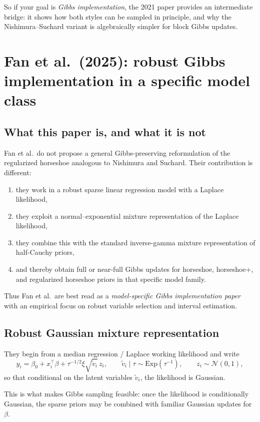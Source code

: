 \documentclass[11pt]{article}
\newcommand{\Normal}{\mathcal{N}}
\begin{document}
So if your goal is \emph{Gibbs implementation}, the 2021 paper provides an intermediate bridge: it shows how both styles can be sampled in principle, and why the Nishimura--Suchard variant is algebraically simpler for block Gibbs updates.

\section{Fan et al.\ (2025): robust Gibbs implementation in a specific model class}

\subsection{What this paper is, and what it is not}

Fan et al.\ do not propose a general Gibbs-preserving reformulation of the regularized horseshoe analogous to Nishimura and Suchard. Their contribution is different:
\begin{enumerate}
\item they work in a robust sparse linear regression model with a Laplace likelihood,
\item they exploit a normal--exponential mixture representation of the Laplace likelihood,
\item they combine this with the standard inverse-gamma mixture representation of half-Cauchy priors,
\item and thereby obtain full or near-full Gibbs updates for horseshoe, horseshoe+, and regularized horseshoe priors in that specific model family.
\end{enumerate}

Thus Fan et al.\ are best read as a \emph{model-specific Gibbs implementation paper} with an empirical focus on robust variable selection and interval estimation.

\subsection{Robust Gaussian mixture representation}

They begin from a median regression / Laplace working likelihood and write
\[
y_i = \beta_0 + x_i^\top\beta + \tau^{-1/2}\xi \sqrt{\tilde v_i}\, z_i,
\qquad
\tilde v_i \mid \tau \sim \mathrm{Exp}(\tau^{-1}),
\qquad
z_i \sim \Normal(0,1),
\]
so that conditional on the latent variables $\tilde v_i$, the likelihood is Gaussian.

This is what makes Gibbs sampling feasible: once the likelihood is conditionally Gaussian, the sparse priors may be combined with familiar Gaussian updates for $\beta$.
\end{document}
